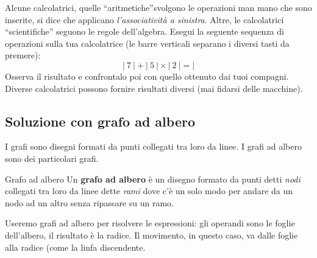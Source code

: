 \begin{osservazione}{}{} 
Alcune calcolatrici, quelle ``aritmetiche''svolgono le 
operazioni man mano che sono inserite, si dice che applicano 
\emph{l'associatività a sinistra}. Altre, le calcolatrici 
``scientifiche'' 
seguono le regole dell'algebra. 
Esegui la seguente sequenza di operazioni sulla tua calcolatrice 
(le barre verticali separano i diversi tasti da premere):
\[|~7~|+|~5~|\times|~2~|=|\]
Osserva il risultato e confrontalo poi con quello ottenuto dai tuoi 
compagni. 
Diverse calcolatrici possono fornire risultati diversi (mai fidarsi delle
macchine).
\end{osservazione}

\subsection{Soluzione con grafo ad albero}
I grafi sono disegni formati da punti collegati tra loro da linee. 
I grafi ad albero sono dei particolari grafi.

\begin{definizione}{Grafo ad albero}{}
Un \textbf{grafo ad albero} è un disegno formato da punti detti 
\emph{nodi} collegati tra loro da linee dette \emph{rami} dove c'è un 
solo modo per andare da un nodo ad un altro senza ripassare su un ramo.
\end{definizione}


Useremo grafi ad albero per risolvere le 
espressioni:
gli operandi sono le foglie dell'albero, il risultato è la radice. 
Il movimento, in questo caso, va dalle foglie alla radice (come la linfa 
discendente.

